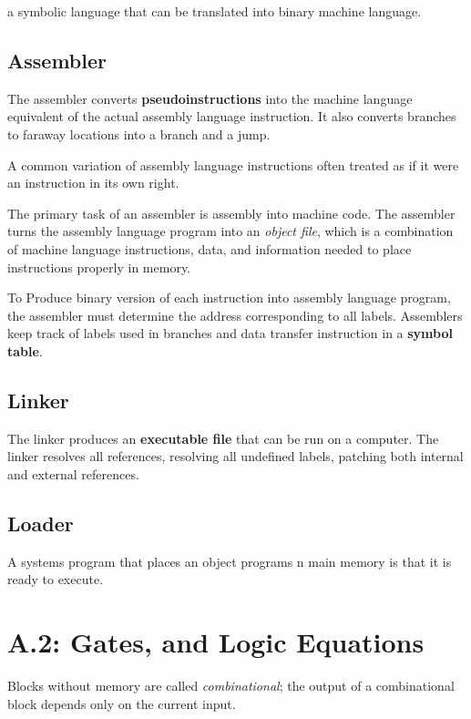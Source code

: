 \documentclass[12pt]{article}
\begin{document}
\begin{definition}
    a symbolic language that can be translated into binary machine language.
\end{definition}

\subsection*{Assembler}
The assembler converts \textbf{pseudoinstructions} into the machine language equivalent of the actual assembly language instruction. It also converts branches to faraway locations into a branch and a jump.
\begin{definition}[Pseudoinstructions]
    A common variation of assembly language instructions often treated as if it were an instruction in its own right.
\end{definition}
The primary task of an assembler is assembly into machine code. The assembler turns the assembly language program into an \emph{object file}, which is a combination of machine language instructions, data, and information needed to place instructions properly in memory.

To Produce binary version of each instruction into assembly language program, the assembler must determine the address corresponding to all labels. Assemblers keep track of labels used in branches and data transfer instruction in a \textbf{symbol table}.

\subsection*{Linker}
The linker produces an \textbf{executable file} that can be run on a computer.
The linker resolves all references, resolving all undefined labels, patching both internal and external references.

\subsection*{Loader}
A systems program that places an object programs n main memory is that it is ready to execute.



\section*{A.2: Gates, and Logic Equations}
Blocks without memory are called \emph{combinational}; the output of a combinational block depends only on the current input.
\end{document}
